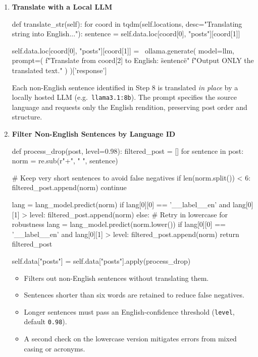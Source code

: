 \documentclass[12pt]{article}
\numberwithin{figure}{section}  %
\begin{document}
\begin{enumerate}
\item \textbf{Translate with a Local LLM}

\begin{python}
def translate_str(self):
    for coord in tqdm(self.locations,
                      desc="Translating string into English..."):
        sentence = self.data.loc[coord[0], "posts"][coord[1]]

        self.data.loc[coord[0], "posts"][coord[1]] = \
            ollama.generate(
                model=llm,
                prompt=(
                    f"Translate from {coord[2]} to English: \"{sentence}\"\n"
                    f"Output ONLY the translated text."
                )
            )['response']
\end{python}

Each non-English sentence identified in Step 8 is translated \emph{in place}
by a locally hosted LLM (e.g.\ \texttt{llama3.1:8b}).  
The prompt specifies the source language and requests only the English
rendition, preserving post order and structure.

\item \textbf{Filter Non-English Sentences by Language ID}

\begin{python}
def process_drop(post, level=0.98):
    filtered_post = []
    for sentence in post:
        norm = re.sub(r"\s+", " ", sentence)

        # Keep very short sentences to avoid false negatives
        if len(norm.split()) < 6:
            filtered_post.append(norm)
            continue

        lang = lang_model.predict(norm)
        if lang[0][0] == '__label__en' and lang[0][1] > level:
            filtered_post.append(norm)
        else:
            # Retry in lowercase for robustness
            lang = lang_model.predict(norm.lower())
            if lang[0][0] == '__label__en' and lang[0][1] > level:
                filtered_post.append(norm)
    return filtered_post

self.data["posts"] = self.data["posts"].apply(process_drop)
\end{python}

\begin{itemize}
  \item Filters out non-English sentences without translating them.
  \item Sentences shorter than six words are retained to reduce false negatives.
  \item Longer sentences must pass an English-confidence threshold
        (\texttt{level}, default \texttt{0.98}).
  \item A second check on the lowercase version mitigates errors from mixed
        casing or acronyms.
\end{itemize}

\end{enumerate}
\end{document}
